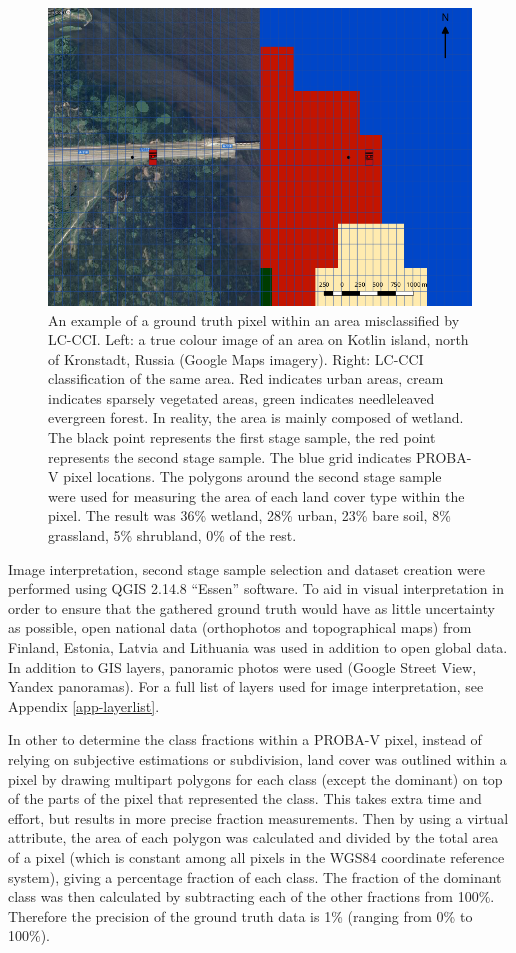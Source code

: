 \documentclass[a4paper,10pt]{book}
\begin{document}
\begin{figure}
 \includegraphics[width=\textwidth]{./thesis-figures/classification-example.png}
 \caption{An example of a ground truth pixel within an area misclassified by LC-CCI. Left: a true colour image of an area on Kotlin island, north of Kronstadt, Russia (Google Maps imagery). Right: LC-CCI classification of the same area. Red indicates urban areas, cream indicates sparsely vegetated areas, green indicates needleleaved evergreen forest. In reality, the area is mainly composed of wetland. The black point represents the first stage sample, the red point represents the second stage sample. The blue grid indicates PROBA-V pixel locations. The polygons around the second stage sample were used for measuring the area of each land cover type within the pixel. The result was 36\% wetland, 28\% urban, 23\% bare soil, 8\% grassland, 5\% shrubland, 0\% of the rest.}
 \label{fig-sampling}
\end{figure}

Image interpretation, second stage sample selection and dataset creation were performed using QGIS 2.14.8 ``Essen'' software. To aid in visual interpretation in order to ensure that the gathered ground truth would have as little uncertainty as possible, open national data (orthophotos and topographical maps) from Finland, Estonia, Latvia and Lithuania was used in addition to open global data. In addition to GIS layers, panoramic photos were used (Google Street View, Yandex panoramas). For a full list of layers used for image interpretation, see Appendix \ref{app-layerlist}.

In other to determine the class fractions within a PROBA-V pixel, instead of relying on subjective estimations or subdivision, land cover was outlined within a pixel by drawing multipart polygons for each class (except the dominant) on top of the parts of the pixel that represented the class. This takes extra time and effort, but results in more precise fraction measurements. Then by using a virtual attribute, the area of each polygon was calculated and divided by the total area of a pixel (which is constant among all pixels in the WGS84 coordinate reference system), giving a percentage fraction of each class. The fraction of the dominant class was then calculated by subtracting each of the other fractions from 100\%. Therefore the precision of the ground truth data is 1\% (ranging from 0\% to 100\%).
\end{document}
